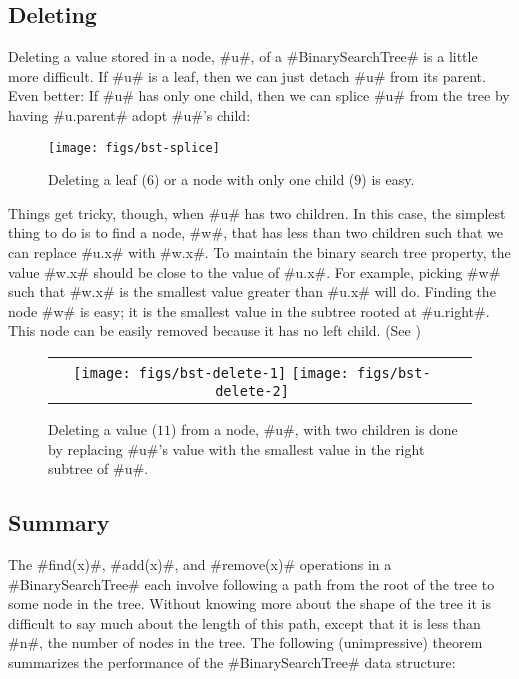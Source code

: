 \subsection{Deleting}

Deleting a value stored in a node, #u#, of a #BinarySearchTree# is a
little more difficult.  If #u# is a leaf, then we can just detach #u#
from its parent.  Even better: If #u# has only one child, then we can
splice #u# from the tree by having #u.parent# adopt #u#'s child:

\begin{figure}
  \begin{center}
    \texttt{[image: figs/bst-splice]}
  \end{center}
  \caption{Deleting a leaf ($6$) or a node with only one child ($9$) is easy.}
\end{figure}

Things get tricky, though, when #u# has two children.  In this case,
the simplest thing to do is to find a node, #w#, that has less than
two children such that we can replace #u.x# with #w.x#.  To maintain
the binary search tree property, the value #w.x# should be close to the
value of #u.x#.  For example, picking #w# such that #w.x# is the smallest
value greater than #u.x# will do.  Finding the node #w# is easy; it is
the smallest value in the subtree rooted at #u.right#.  This node can
be easily removed because it has no left child.  (See )

\begin{figure}
  \begin{center}
    \begin{tabular}{cc}
    \texttt{[image: figs/bst-delete-1]}
    \texttt{[image: figs/bst-delete-2]}
    \end{tabular}
  \end{center}
  \caption{Deleting a value ($11$) from a node, #u#, with two children is done by replacing #u#'s value with the smallest value in the right subtree of #u#.}
\end{figure}

\subsection{Summary}

The #find(x)#, #add(x)#, and #remove(x)# operations in a
#BinarySearchTree# each involve following a path from the root of the
tree to some node in the tree. Without knowing more about the shape of
the tree it is difficult to say much about the length of this path,
except that it is less than #n#, the number of nodes in the tree.
The following (unimpressive) theorem summarizes the performance of the
#BinarySearchTree# data structure:


